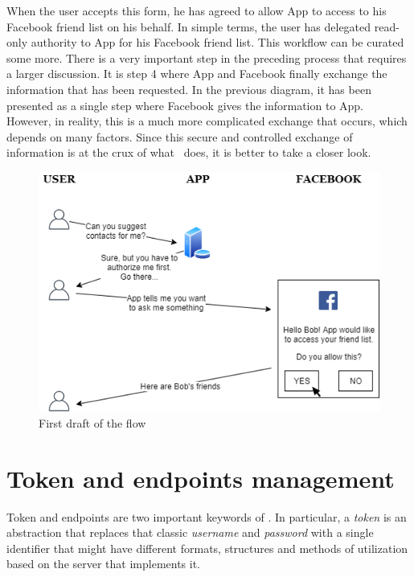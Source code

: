 When the user accepts this form, he has agreed to allow App to access to his Facebook friend list on his behalf. In simple terms, the user has delegated read-only authority to App for his Facebook friend list.
This workflow can be curated some more. There is a very important step in the
preceding process that requires a larger discussion. It is step 4 where App and
Facebook finally exchange the information that has been requested. In the previous diagram, it has been presented as a single step where Facebook gives the information to App. However, in reality, this is a much more complicated exchange that occurs, which depends on many factors. Since this secure and controlled exchange of information is at the crux of what \oauth\ does, it is better to take a closer look.

\begin{figure}
    \centering
    \includegraphics[scale=0.74]{chapters/images/chp2/flow1.png}
    \caption{First draft of the flow}
    \label{fig:flow1}
    \vspace{0.5cm}
\end{figure}

\section{Token and endpoints management}
Token and endpoints are two important keywords of \textit{\oauth}. In particular, a \textit{token} is an abstraction that replaces that classic \textit{username} and \textit{password} with a single identifier that might have different formats, structures and methods of utilization based on the server that implements it.

